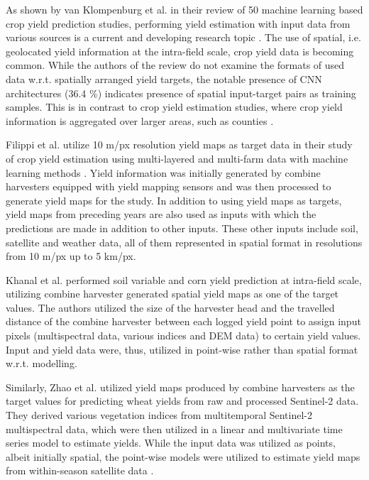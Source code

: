 As shown by van Klompenburg et al. in their review of 50 machine learning based crop yield prediction studies, performing yield estimation with input data from various sources is a current and developing research topic \cite{VanKlompenburg2020}. The use of spatial, i.e. geolocated yield information at the intra-field scale, crop yield data is becoming common. While the authors of the review do not examine the formats of used data w.r.t. spatially arranged yield targets, the notable presence of CNN architectures (36.4 \%) indicates presence of spatial input-target pairs as training samples. This is in contrast to crop yield estimation studies, where crop yield information is aggregated over larger areas, such as counties \cite{Lin2020, Wang2020, Sun2019}. 

Filippi et al. utilize 10 m/px resolution yield maps as target data in their study of crop yield estimation using multi-layered and multi-farm data with machine learning methods \cite{Filippi2019}. Yield information was initially generated by combine harvesters equipped with yield mapping sensors and was then processed to generate yield maps for the study. In addition to using yield maps as targets, yield maps from preceding years are also used as inputs with which the predictions are made in addition to other inputs. These other inputs include soil, satellite and weather data, all of them represented in spatial format in resolutions from 10 m/px up to 5 km/px.

Khanal et al. \cite{Khanal2018} performed soil variable and corn yield prediction at intra-field scale, utilizing combine harvester generated spatial yield maps as one of the target values. The authors utilized the size of the harvester head and the travelled distance of the combine harvester between each logged yield point to assign input pixels (multispectral data, various indices and DEM data) to certain yield values. Input and yield data were, thus, utilized in point-wise rather than spatial format w.r.t. modelling.

Similarly, Zhao et al. \cite{Zhao2020} utilized yield maps produced by combine harvesters as the target values for predicting wheat yields from raw and processed Sentinel-2 data. They derived various vegetation indices from multitemporal Sentinel-2 multispectral data, which were then utilized in a linear and multivariate time series model to estimate yields. While the input data was utilized as points, albeit initially spatial, the point-wise models were utilized to estimate yield maps from within-season satellite data .
